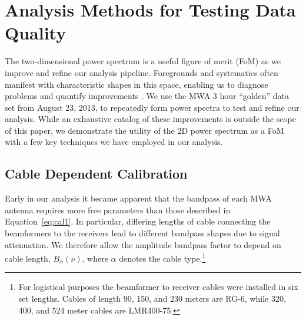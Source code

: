 \documentclass[iop]{emulateapj}
\begin{document}
\section{Analysis Methods for Testing Data Quality}\label{sec:techniques}

The two-dimensional power spectrum is a useful figure of merit (FoM) as we improve and 
refine our analysis pipeline. Foregrounds and systematics often manifest with characteristic 
shapes in this space, enabling us to diagnose problems and quantify improvements 
\citep{Morales:2012}. We use the MWA 3 hour ``golden'' data set from August 23, 2013, to 
repeatedly form power spectra to test and refine our analysis. While an exhaustive catalog 
of these improvements is outside the scope of this paper, we 
demonstrate the utility of the 2D power spectrum as a FoM with a few key techniques we 
have employed in our analysis. 

\subsection{Cable Dependent Calibration}\label{sec:cables}

Early in our analysis it became apparent that the bandpass of each MWA antenna requires 
more free parameters than those described in Equation~\ref{eq:cal1}. In particular, differing 
lengths of cable connecting the beamformers to the receivers
 lead to different bandpass shapes due to signal attenuation. 
We therefore allow the amplitude bandpass factor to depend on cable length, $B_{\alpha}
(\nu)$, where $\alpha$ denotes the cable type.\footnote{For logistical purposes the 
beamformer to receiver cables were installed in six set lengths. Cables of length 90, 150, 
and 230 meters are RG-6, while 320, 400, and 524 meter cables are LMR400-75.}
\end{document}
